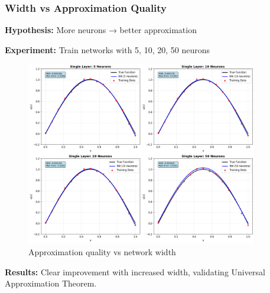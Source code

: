 \documentclass[notes]{beamer}
\begin{document}
\begin{frame}
\frametitle{Width vs Approximation Quality}

\textbf{Hypothesis:} More neurons → better approximation

\textbf{Experiment:} Train networks with 5, 10, 20, 50 neurons

\begin{figure}[ht]
	\centering
	\includegraphics[width=0.9\textwidth]{figs/width-quality.png}
	\caption*{Approximation quality vs network width}
\end{figure}

\textbf{Results:} Clear improvement with increased width, validating Universal Approximation Theorem.

\end{frame}
\end{document}
